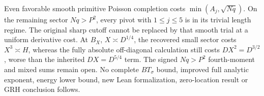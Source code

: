 Even favorable smooth primitive Poisson completion costs
$\min(A_j,\sqrt{Nq})$. On the remaining sector $Nq>P^2$, every pivot with $1\le j\le5$
is in its trivial length regime. The original sharp cutoff cannot be
replaced by that smooth trial at a uniform derivative cost.
At $B_X$, $X\asymp D^{1/4}$, the recovered small sector costs $X^3\asymp H$,
whereas the fully absolute off-diagonal calculation still costs
$DX^2=D^{3/2}$, worse than the inherited $DX=D^{5/4}$ term.
The signed $Nq>P^2$ fourth-moment and mixed sums remain open.
No complete $BT_\sigma$ bound, improved full analytic exponent, energy
lower bound, new Lean formalization, zero-location result or GRH
conclusion follows.
